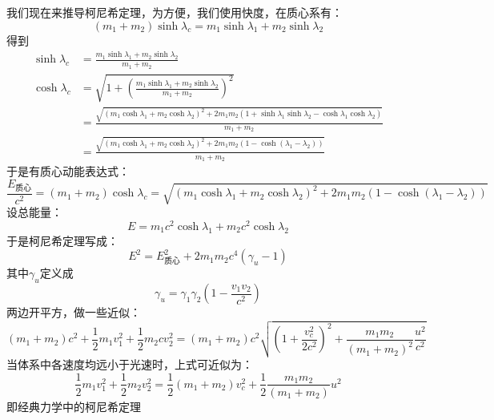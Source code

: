 \documentclass[hyperref,utf8]{ctexart}
\begin{document}
我们现在来推导柯尼希定理，为方便，我们使用快度，在质心系有：
\[(m_1+m_2)\sinh{\lambda_c}=m_1\sinh{\lambda_1}+m_2\sinh{\lambda_2}\]
得到
\begin{equation*}
    \begin{split}
    \sinh{\lambda_c}&=\frac{m_1\sinh{\lambda_1}+m_2\sinh{\lambda_2}}{m_1+m_2}\\
    \cosh{\lambda_c}&=\sqrt{1+(\frac{m_1\sinh{\lambda_1}+m_2\sinh{\lambda_2}}{m_1+m_2})^2}\\
    &=\frac{\sqrt{(m_1\cosh{\lambda_1}+m_2\cosh{\lambda_2})^2+2m_1m_2(1+\sinh{\lambda_1}\sinh{\lambda_2}-\cosh{\lambda_1}\cosh{\lambda_2})}}{m_1+m_2}\\&=\frac{\sqrt{(m_1\cosh{\lambda_1}+m_2\cosh{\lambda_2})^2+2m_1m_2(1-\cosh{(\lambda_1-\lambda_2)})}}{m_1+m_2}
    \end{split}
\end{equation*}
于是有质心动能表达式：
\[\frac{E_\text{质心}}{c^2}=(m_1+m_2)\cosh{\lambda_c}=\sqrt{(m_1\cosh{\lambda_1}+m_2\cosh{\lambda_2})^2+2m_1m_2(1-\cosh{(\lambda_1-\lambda_2)})}\]
设总能量：
\[E=m_1c^2\cosh{\lambda_1}+m_2c^2\cosh{\lambda_2}\]
于是柯尼希定理写成：
\[E^2=E^2_\text{质心}+2m_1m_2c^4(\gamma_u-1)\]
其中$\gamma_u$定义成
\[\gamma_u=\gamma_1 \gamma_2(1-\frac{v_1 v_2}{c^2})\]
两边开平方，做一些近似：
\[(m_1+m_2)c^2+\frac12 m_1v^2_1+\frac12 m_2cv^2_2=(m_1+m_2)c^2\sqrt{(1+\frac{v^2_c}{2c^2})^2+\frac{m_1m_2}{(m_1+m_2)^2}\frac{u^2}{c^2}}\]
当体系中各速度均远小于光速时，上式可近似为：
\[\frac12 m_1v^2_1+\frac12 m_2v^2_2=\frac12 (m_1+m_2)v^2_c+\frac12 \frac{m_1m_2}{(m_1+m_2)}u^2\]
即经典力学中的柯尼希定理
\end{document}
